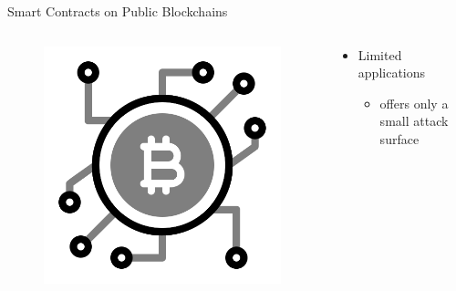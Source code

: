 \documentclass[]{beamer}
\begin{document}
\begin{frame}{Smart Contracts on Public Blockchains}

\begin{columns}
	\begin{column}{0.3\textwidth}
		\begin{figure}
		\includegraphics[height = 0.25\textheight]{../assets/images/bitcoin_network_symbol}	
		\end{figure}
	\end{column}
	
	\begin{column}{0.7\textwidth}
		\begin{itemize}
			\item Limited applications
			\begin{itemize}
				\item offers only a small attack surface
			\end{itemize}
		\end{itemize}
	\end{column}
	
\end{columns}

\begin{columns}


\end{columns}
\end{frame}
\end{document}
